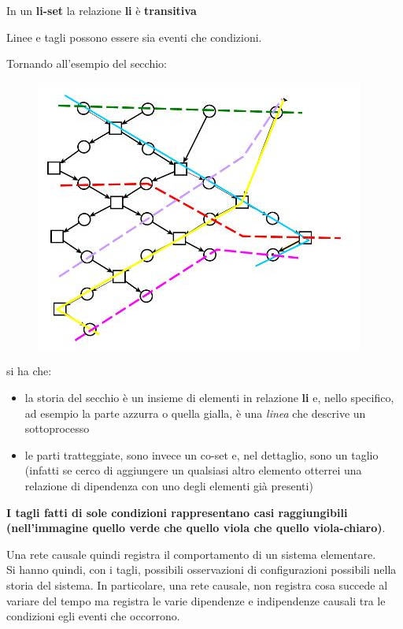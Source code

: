 \begin{nota}
In un \textbf{li-set} la relazione \textbf{li} è \textbf{transitiva}
\end{nota}
\begin{nota}
Linee e tagli possono essere sia eventi che condizioni.
\end{nota}
\begin{esempio}
  Tornando all'esempio del secchio:
  \begin{figure}[H]
    \centering
    \includegraphics[scale = 0.5]{img/ta.jpg} 
  \end{figure}
  si ha che:
  \begin{itemize}
    \item la storia del secchio è un insieme di elementi in relazione
    \textbf{li} e, nello specifico, ad esempio la parte azzurra o quella gialla,
    è una \textit{linea} che descrive un sottoprocesso
    \item le parti tratteggiate, sono invece
    un co-set e, nel dettaglio, sono un 
    taglio (infatti se cerco di aggiungere un qualsiasi altro elemento otterrei
    una relazione di dipendenza con uno degli elementi già presenti)
  \end{itemize}
\end{esempio}
\textbf{I tagli fatti di sole condizioni rappresentano casi raggiungibili
  (nell'immagine quello verde che quello viola che quello viola-chiaro)}.\\
\begin{nota}
Una rete causale quindi registra il comportamento di un sistema elementare.\\
Si hanno quindi, con i tagli, possibili osservazioni di configurazioni possibili
nella storia del sistema. In particolare, una rete causale, non registra cosa succede al variare del tempo ma registra le varie dipendenze e indipendenze causali tra le condizioni egli eventi che occorrono.
\end{nota}
